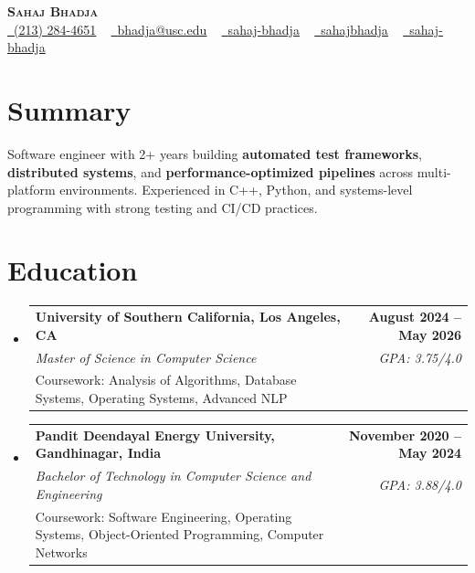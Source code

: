 \documentclass[letterpaper,10pt]{article}
\makeatletter
\newcommand{\resumeEduSubheading}[5]{\vspace{-1pt}\item\begin{tabular*}{1.0\textwidth}[t]{l@{\extracolsep{\fill}}r}\textbf{#1} & \textbf{\small #2} \\\textit{\small #3} & \textit{\small #4} \\\small #5 & \\\end{tabular*}\vspace{-4pt}}
\newcommand{\resumeSubHeadingListStart}{\begin{itemize}[leftmargin=0.0in, label={}]}
\newcommand{\resumeSubHeadingListEnd}{\end{itemize}}
\makeatother
\begin{document}
\begin{center}
{\Huge \scshape \textbf{Sahaj Bhadja}} \\ \vspace{1pt}
\small \href{tel:(213) 284-4651}{\faPhone\ \underline{(213) 284-4651}} ~ \href{mailto:bhadja@usc.edu}{\raisebox{-0.2\height}\faEnvelope\ \underline{bhadja@usc.edu}} ~
\href{https://www.linkedin.com/in/sahaj-bhadja/}{\raisebox{-0.2\height}\faLinkedin\ \underline{sahaj-bhadja}} ~ \href{https://github.com/SAHAJ-BHADJA}{\raisebox{-0.2\height}\faGithub\ \underline{sahajbhadja}} ~
\href{https://sahaj-bhadja.vercel.app/}{\raisebox{-0.2\height}\faGlobe\ \underline{sahaj-bhadja}}
\end{center}
\vspace{-18pt}
\section{Summary}
\begin{itemize}[leftmargin=0.15in, label={}]
\small{\item{Software engineer with 2+ years building \textbf{automated test frameworks}, \textbf{distributed systems}, and \textbf{performance-optimized pipelines} across multi-platform environments. Experienced in C++, Python, and systems-level programming with strong testing and CI/CD practices.}}
\end{itemize}
\vspace{-16pt}
\section{Education}
\resumeSubHeadingListStart
\resumeEduSubheading{University of Southern California, Los Angeles, CA}{August 2024 -- May 2026}{Master of Science in Computer Science}{GPA: 3.75/4.0}{Coursework: Analysis of Algorithms, Database Systems, Operating Systems, Advanced NLP}
\vspace{-9pt}
\resumeEduSubheading{Pandit Deendayal Energy University, Gandhinagar, India}{November 2020 -- May 2024}{Bachelor of Technology in Computer Science and Engineering}{GPA: 3.88/4.0}{Coursework: Software Engineering, Operating Systems, Object-Oriented Programming, Computer Networks}
\resumeSubHeadingListEnd
\vspace{-14pt}
\end{document}
